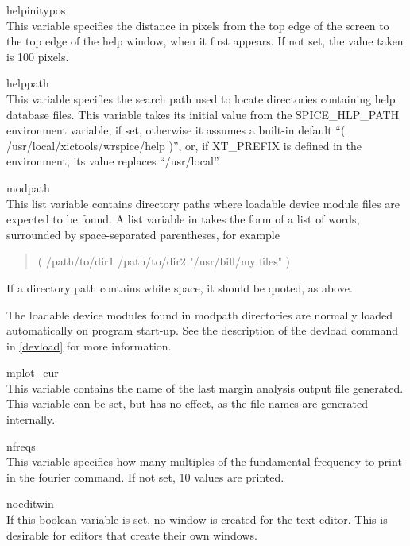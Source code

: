 \begin{description}
\item{\et helpinitypos}\\
This variable specifies the distance in pixels from the top edge of
the screen to the top edge of the help window, when it first appears. 
If not set, the value taken is 100 pixels.

\item{\et helppath}\\
This variable specifies the search path used to locate directories
containing help database files.  This variable takes its initial value
from the {\et SPICE\_HLP\_PATH} environment variable, if set,
otherwise it assumes a built-in default ``{\vt (
/usr/local/xictools/wrspice/help )}'', or, if {\et XT\_PREFIX} is
defined in the environment, its value replaces ``{\vt /usr/local}''.

\item{\et modpath}\\
This list variable contains directory paths where loadable device
module files are expected to be found.  A list variable in {\WRspice}
takes the form of a list of words, surrounded by space-separated
parentheses, for example
\begin{quote}\vt
( /path/to/dir1 /path/to/dir2 "/usr/bill/my files" )
\end{quote}
If a directory path contains white space, it should be quoted, as
above.

The loadable device modules found in {\vt modpath} directories are
normally loaded automatically on program start-up.  See the
description of the {\cb devload} command in \ref{devload} for more
information.

\item{\et mplot\_cur}\\
This variable contains the name of the last margin analysis output
file generated.  This variable can be set, but has no effect, as the
file names are generated internally.

\item{\et nfreqs}\\
This variable specifies how many multiples of the fundamental
frequency to print in the {\cb fourier} command.  If not set, 10
values are printed.

\item{\et noeditwin}\\
If this boolean variable is set, no window is created for the text
editor.  This is desirable for editors that create their own windows.


\end{description}
